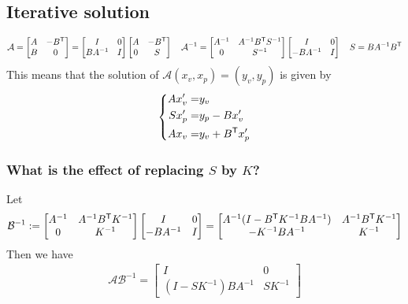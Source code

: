 \subsection{Iterative solution}\label{subsec:}
%
%
\begin{align*}
\mathcal A = 
\begin{bmatrix}
A & -{B}^{\mathsf{T}}\\
B & 0 
\end{bmatrix}
=
\begin{bmatrix}
I  & 0\\
BA^{-1} & I
\end{bmatrix}
\begin{bmatrix}
A  & -{B}^{\mathsf{T}}\\
0 & S
\end{bmatrix}
\quad
\mathcal A^{-1} = 
\begin{bmatrix}
A^{-1}  & A^{-1}{B}^{\mathsf{T}}S^{-1}\\
0 & S^{-1}
\end{bmatrix}
\begin{bmatrix}
I  & 0\\
-BA^{-1} & I
\end{bmatrix}
\quad
S = B A^{-1}{B}^{\mathsf{T}}
\end{align*}
%
This means that the solution of $\mathcal A (x_v,x_p) = (y_v,y_p)$ is given by
%
\begin{align*}
%
\left\{
\begin{aligned}
A {x_v'} =& y_v\\
S {x_p'} =& y_p - B {x_v'}\\
A x_v =& y_v + \transpose{B} x_p'\\
\end{aligned}
\right.
%
\end{align*}
%
%
\subsubsection{What is the effect of replacing $S$ by $K$?}
%
Let
%
\begin{align*}
\mathcal B^{-1} := 
\begin{bmatrix}
A^{-1}  & A^{-1}{B}^{\mathsf{T}}K^{-1}\\
0 & K^{-1}
\end{bmatrix}
\begin{bmatrix}
I  & 0\\
-BA^{-1} & I
\end{bmatrix}
=
\begin{bmatrix}
A^{-1}(I-{B}^{\mathsf{T}}K^{-1}BA^{-1})  & A^{-1}{B}^{\mathsf{T}}K^{-1}\\
-K^{-1}BA^{-1} & K^{-1}
\end{bmatrix}
\end{align*}
%
Then we have
%
\begin{align*}
\mathcal A\mathcal B^{-1} = 
\begin{bmatrix}
I &  0\\
(I-SK^{-1})BA^{-1}& SK^{-1}
\end{bmatrix}
\end{align*}
%



